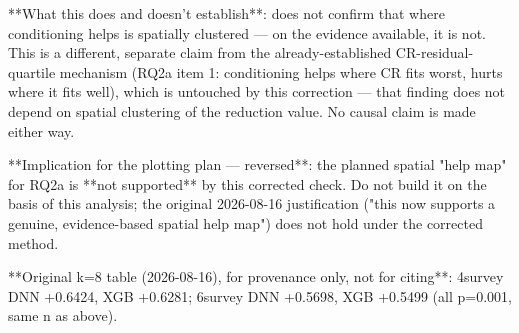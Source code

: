 **What this does and doesn't establish**: does not confirm that where conditioning helps is
spatially clustered — on the evidence available, it is not. This is a different, separate claim
from the already-established CR-residual-quartile mechanism (RQ2a item 1: conditioning helps where
CR fits worst, hurts where it fits well), which is untouched by this correction — that finding
does not depend on spatial clustering of the reduction value. No causal claim is made either way.

**Implication for the plotting plan — reversed**: the planned spatial "help map" for RQ2a is **not
supported** by this corrected check. Do not build it on the basis of this analysis; the original
2026-08-16 justification ("this now supports a genuine, evidence-based spatial help map") does not
hold under the corrected method.

**Original k=8 table (2026-08-16), for provenance only, not for citing**: 4survey DNN +0.6424, XGB
+0.6281; 6survey DNN +0.5698, XGB +0.5499 (all p=0.001, same n as above).
